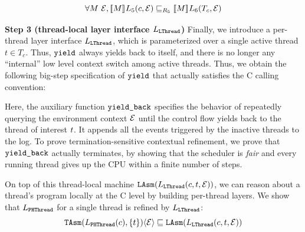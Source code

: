 {{\begin{lemma}
{\small
\[
\forall M~ \oracle, 
\sem{ }{M}L_5(c,\oracle) \Refrel_{R_5} 
\sem{}{M}L_6(T_c, \oracle)
\]}
\label{whole_thread_composition}
\end{lemma}}


\noindent\textbf{Step 3 (thread-local layer interface $L_\lthread$)} 
Finally, we introduce a per-thread layer interface $L_\lthread$, which is parameterized
over a single active thread $t\in T_c$.
Thus, $\yield$ always yields back to itself,
and there is no longer any ``internal'' low level context switch among active threads.
Thus, we obtain the following big-step specification of $\yield$ that actually
satisfies the C calling convention:
\begin{small}
\begin{mathpar}
\end{mathpar}
\end{small}%
Here, the auxiliary function $\comm{yield\_back}$ 
specifies the behavior of repeatedly querying the environment context
$\oracle$ until the control flow yields back to the thread of interest $\tid$.
It appends all the events triggered by the inactive threads to the log.
To prove termination-sensitive contextual refinement,
we prove that $\comm{yield\_back}$ actually terminates,
by showing that the scheduler is \emph{fair} and every running
thread gives up the CPU within a finite number of steps.

On top of this thread-local machine $\LAsm(L_\lthread(c, t, \oracle))$,
we can reason about a thread's program 
locally at the C level by building per-thread layers.
We show that $L_\phthread$ for a single thread is refined by $L_\lthread$:
\[ \TAsm(L_\phthread(c), \{t\})\langle \oracle \rangle \Refrel \LAsm(L_\lthread(c, t, \oracle)) \]
%

}
